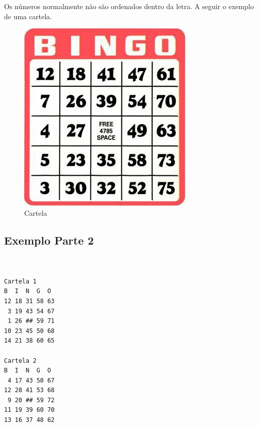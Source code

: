 \documentclass[12pt]{article}
\begin{document}
Os números normalmente não são ordenados dentro da letra. A seguir o exemplo de uma
cartela.

\begin{figure}[hf]
\centering
\includegraphics[width=0.6\linewidth]{./imagens/cartela}
\caption{Cartela}
\end{figure}

\subsection{Exemplo Parte 2}

\begin{verbatim}


Cartela 1
B  I  N  G  O
12 18 31 58 63 
 3 19 43 54 67 
 1 26 ## 59 71 
10 23 45 50 68 
14 21 38 60 65 

Cartela 2
B  I  N  G  O
 4 17 43 50 67 
12 28 41 53 68 
 9 20 ## 59 72 
11 19 39 60 70 
13 16 37 48 62
\end{verbatim}

\begin{verbatim}


\end{verbatim}
\end{document}
